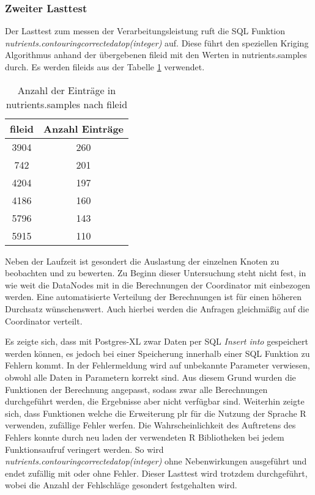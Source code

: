 \subsubsection{Zweiter Lasttest}
Der Lasttest zum messen der Verarbeitungsleistung ruft die SQL Funktion\\
\textit{nutrients.contouringcorrectedatop(integer)} auf.
Diese führt den speziellen Kriging Algorithmus anhand der übergebenen fileid mit den Werten in nutrients.samples durch.
Es werden fileids aus der Tabelle \ref{tbl:entrysnsamples} verwendet.
\begin{table}[h!]
\centering
\small
\begin{tabular}{c|c}
\textbf{fileid} & \textbf{Anzahl Einträge} \\ \hline
3904 & 260 \\ \hline
742 & 201 \\ \hline
4204 & 197 \\ \hline
4186 & 160 \\ \hline
5796 & 143 \\ \hline
5915 & 110 \\
\end{tabular}
\caption{Anzahl der Einträge in nutrients.samples nach fileid}
\label{tbl:entrysnsamples}
\end{table}
Neben der Laufzeit ist gesondert die Auslastung der einzelnen Knoten zu beobachten und zu bewerten.
Zu Beginn dieser Untersuchung steht nicht fest, in wie weit die DataNodes mit in die Berechnungen der Coordinator mit einbezogen werden.
Eine automatisierte Verteilung der Berechnungen ist für einen höheren Durchsatz wünschenswert.
Auch hierbei werden die Anfragen gleichmäßig auf die Coordinator verteilt.

Es zeigte sich, dass mit Postgres-XL zwar Daten per SQL \textit{Insert into} gespeichert werden können, es jedoch bei einer Speicherung innerhalb einer SQL Funktion zu Fehlern kommt.
In der Fehlermeldung wird auf unbekannte Parameter verwiesen, obwohl alle Daten in Parametern korrekt sind.
Aus diesem Grund wurden die Funktionen der Berechnung angepasst, sodass zwar alle Berechnungen durchgeführt werden, die Ergebnisse aber nicht verfügbar sind.
Weiterhin zeigte sich, dass Funktionen welche die Erweiterung plr für die Nutzung der Sprache R verwenden, zufällige Fehler werfen.
Die Wahrscheinlichkeit des Auftretens des Fehlers konnte durch neu laden der verwendeten R Bibliotheken bei jedem Funktionsaufruf veringert werden.
So wird \textit{nutrients.contouringcorrectedatop(integer)} ohne Nebenwirkungen ausgeführt und endet zufällig mit oder ohne Fehler.
Dieser Lasttest wird trotzdem durchgeführt, wobei die Anzahl der Fehlschläge gesondert festgehalten wird.

